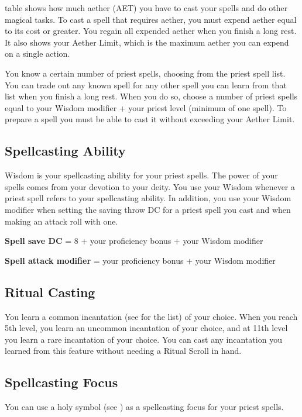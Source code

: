  table shows how much aether (AET) you have to cast your spells and do other magical tasks. To cast a spell that requires aether, you must expend aether equal to its cost or greater. You regain all expended aether when you finish a long rest. It also shows your Aether Limit, which is the maximum aether you can expend on a single action.

You know a certain number of priest spells, choosing from the priest spell list. You can trade out any known spell for any other spell you can learn from that list when you finish a long rest. When you do so, choose a number of priest spells equal to your Wisdom modifier + your priest level (minimum of one spell). To prepare a spell you must be able to cast it without exceeding your Aether Limit.

\subsection{Spellcasting Ability}

Wisdom is your spellcasting ability for your priest spells. The power of your spells comes from your devotion to your deity. You use your Wisdom whenever a priest spell refers to your spellcasting ability. In addition, you use your Wisdom modifier when setting the saving throw DC for a priest spell you cast and when making an attack roll with one.

\textbf{Spell save DC} = 8 + your proficiency bonus + your Wisdom modifier

\textbf{Spell attack modifier} = your proficiency bonus + your Wisdom modifier

\subsection{Ritual Casting}

You learn a common incantation (see  for the list) of your choice. When you reach 5th level, you learn an uncommon incantation of your choice, and at 11th level you learn a rare incantation of your choice. You can cast any incantation you learned from this feature without needing a Ritual Scroll in hand.

\subsection{Spellcasting Focus}

You can use a holy symbol (see ) as a spellcasting focus for your priest spells.


